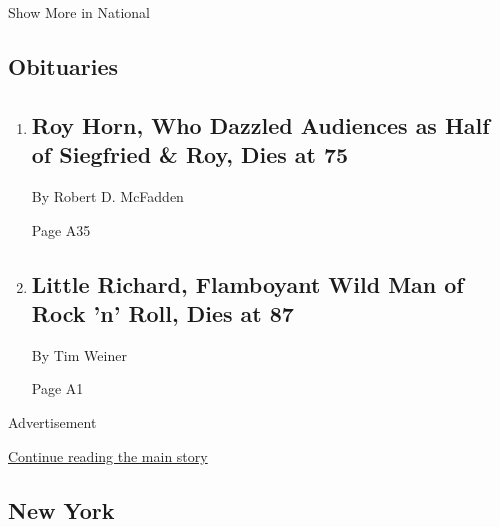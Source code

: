 Show More in National

\hypertarget{obituaries}{%
\subsection{Obituaries}\label{obituaries}}

\begin{enumerate}
\def\labelenumi{\arabic{enumi}.}
\item
  \href{/2020/05/08/obituaries/roy-horn-dead-covid.html}{}

  \hypertarget{roy-horn-who-dazzled-audiences-as-half-of-siegfried--roy-dies-at-75}{%
  \subsection{Roy Horn, Who Dazzled Audiences as Half of Siegfried \&
  Roy, Dies at
  75}\label{roy-horn-who-dazzled-audiences-as-half-of-siegfried--roy-dies-at-75}}

  By Robert D. McFadden

  Page A35
\item
  \href{/2020/05/09/arts/music/little-richard-dead.html}{}

  \hypertarget{little-richard-flamboyant-wild-man-of-rock-n-roll-dies-at-87-1}{%
  \subsection{Little Richard, Flamboyant Wild Man of Rock 'n' Roll, Dies
  at
  87}\label{little-richard-flamboyant-wild-man-of-rock-n-roll-dies-at-87-1}}

  By Tim Weiner

  Page A1
\end{enumerate}

Advertisement

\protect\hyperlink{after-mid3}{Continue reading the main story}

\hypertarget{new-york}{%
\subsection{New York}\label{new-york}}

